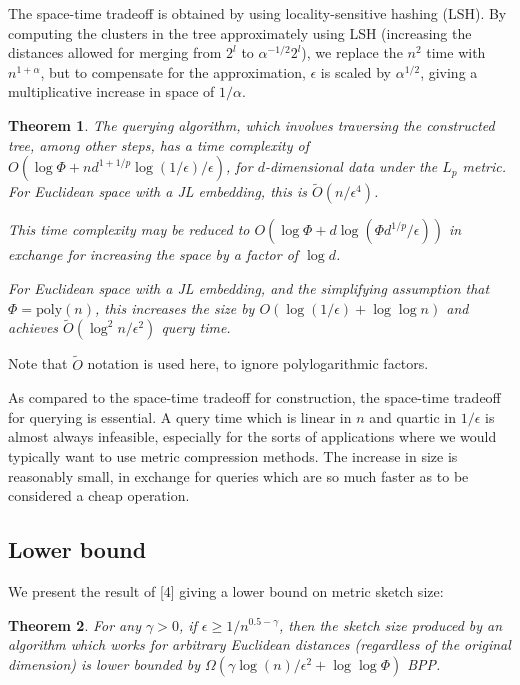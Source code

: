 \documentclass{article}
\newtheorem{theorem}{Theorem}
\begin{document}
The space-time tradeoff is obtained by using locality-sensitive hashing (LSH).
By computing the clusters in the tree approximately using LSH (increasing the
distances allowed for merging from $2^l$ to $\alpha^{-1/2}2^l$), we replace the $n^2$
time with $n^{1+\alpha}$, but to compensate for the approximation, $\epsilon$ is scaled by
$\alpha^{1/2}$, giving a multiplicative increase in space of $1/\alpha$.

\begin{theorem}
  The querying algorithm, which involves traversing the constructed tree, among
  other steps, has a time complexity of $O(\log \Phi + n d^{1+1/p} \log(1/\epsilon) / \epsilon)$,
  for $d$-dimensional data under the $L_p$ metric. For Euclidean space with a JL
  embedding, this is $\tilde{O}(n/\epsilon^4)$.

  This time complexity may be reduced to $O(\log \Phi + d \log(\Phi d^{1/p} / \epsilon) )$ in
  exchange for increasing the space by a factor of $\log d$.

  For Euclidean space with a JL embedding, and the simplifying assumption that
  $\Phi = \mathrm{poly }(n)$, this increases the size by $O(\log (1/\epsilon) + \log \log
  n)$ and achieves $\tilde{O}(\log ^2 n / \epsilon^2)$ query time.
\end{theorem}

Note that $\tilde{O}$ notation is used here, to ignore polylogarithmic factors.

As compared to the space-time tradeoff for construction, the space-time tradeoff
for querying is essential. A query time which is linear in $n$ and quartic in
$1/\epsilon$ is almost always infeasible, especially for the sorts of applications
where we would typically want to use metric compression methods. The increase in
size is reasonably small, in exchange for queries which are so much faster as to
be considered a cheap operation.

\subsection{Lower bound}

We present the result of [4] giving a lower bound on metric sketch size:

\begin{theorem}
  For any $\gamma > 0$, if $\epsilon \geq 1/n^{0.5 - \gamma}$, then the sketch size produced by an
  algorithm which works for arbitrary Euclidean distances (regardless of the
  original dimension) is lower bounded by $\Omega(\gamma \log(n)/ \epsilon^2 + \log \log \Phi)$ BPP.
\end{theorem}
\end{document}
